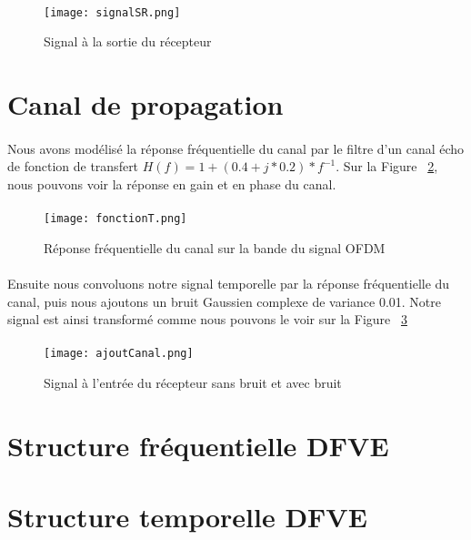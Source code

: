 \paragraph{}
\vspace{1\baselineskip}
\begin{figure}[!h]
  \centering
  \texttt{[image: signalSR.png]}
  \caption{Signal à la sortie du récepteur }
	\label{signal} 
\end{figure}
\vspace{1\baselineskip}

\section{Canal de propagation}
\paragraph{}
Nous avons modélisé la réponse fréquentielle du canal par le filtre d'un canal écho de fonction de transfert $H(f)=1+(0.4+j*0.2)*f^{-1}$. Sur la Figure ~\ref{fonctionT}, nous pouvons voir la réponse en gain et en phase du canal.
\paragraph{}
\vspace{1\baselineskip}
\begin{figure}[!h]
  \centering
  \texttt{[image: fonctionT.png]}
  \caption{Réponse fréquentielle du canal sur la bande du signal OFDM}
	\label{fonctionT} 
\end{figure}
\vspace{1\baselineskip}
\paragraph{}
Ensuite nous convoluons notre signal temporelle par la réponse fréquentielle du canal, puis nous ajoutons un bruit Gaussien complexe de variance 0.01. Notre signal est ainsi transformé comme nous pouvons le voir sur la Figure ~\ref{ajoutCanal} 
\paragraph{}
\vspace{1\baselineskip}
\begin{figure}[!h]
  \centering
  \texttt{[image: ajoutCanal.png]}
  \caption{Signal à l'entrée du récepteur sans bruit et avec bruit}
	\label{ajoutCanal} 
\end{figure}
\vspace{1\baselineskip}


\section{Structure fréquentielle DFVE}


\section{Structure temporelle DFVE}






